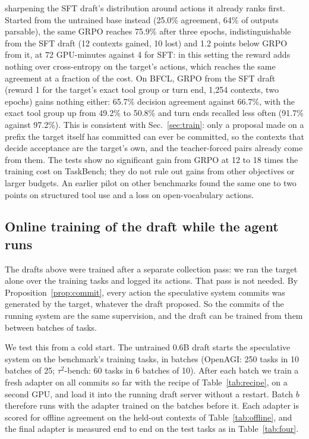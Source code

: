 sharpening the SFT draft's distribution around actions it already ranks first. Started from the untrained base
instead (25.0\% agreement, 64\% of outputs parsable), the same GRPO reaches 75.9\% after three epochs,
indistinguishable from the SFT draft (12 contexts gained, 10 lost) and 1.2 points below GRPO from it, at
72 GPU-minutes against 4 for SFT: in this setting the reward adds nothing over cross-entropy on the
target's actions, which reaches the same agreement at a fraction of the cost. On BFCL, GRPO from the SFT draft
(reward 1 for the target's exact tool group or turn end, 1{,}254 contexts, two epochs) gains nothing either:
65.7\% decision agreement against 66.7\%, with the exact tool group up from 49.2\% to 50.8\% and turn ends
recalled less often (91.7\% against 97.2\%). This is consistent
with Sec.~\ref{sec:train}: only a proposal made on a prefix the target itself has committed can ever
be committed, so the contexts that decide acceptance are the target's own, and the teacher-forced pairs
already come from them. The tests show no significant gain from GRPO at 12 to 18 times the training cost on
TaskBench; they do not rule out gains from other objectives or larger budgets. An earlier pilot on
other benchmarks found the same one to two points on structured tool use and a loss on open-vocabulary actions.



\subsection{Online training of the draft while the agent runs}
\label{app:detail:online}
The drafts above were trained after a separate collection pass: we ran the target alone over the training
tasks and logged its actions. That pass is not needed. By Proposition~\ref{prop:commit}, every action the
speculative system commits was generated by the target, whatever the draft proposed. So the commits of the
running system are the same supervision, and the draft can be trained from them between batches of tasks.

We test this from a cold start. The untrained 0.6B draft starts the speculative system on the benchmark's
training tasks, in batches (OpenAGI: 250 tasks in 10 batches of 25; $\tau^2$-bench: 60 tasks in 6 batches of 10).
After each batch we train a fresh adapter on all commits so far with the recipe of Table~\ref{tab:recipe},
on a second GPU, and load it into the running draft server without a restart. Batch $b$ therefore runs with
the adapter trained on the batches before it. Each adapter is scored for offline agreement on the held-out
contexts of Table~\ref{tab:offline}, and the final adapter is measured end to end on the test tasks as in
Table~\ref{tab:four}.

